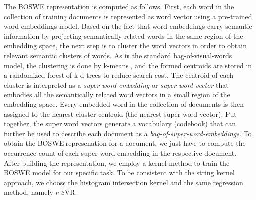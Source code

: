 \documentclass[11pt,a4paper]{article}
\begin{document}
The BOSWE representation is computed as follows. First, each word in the collection of training documents is represented as word vector using a pre-trained word embeddings model. Based on the fact that word embeddings carry semantic information by projecting semantically related words in the same region of the embedding space, the next step is to cluster the word vectors in order to obtain relevant semantic clusters of words. As in the standard bag-of-visual-words model, the clustering is done by k-means \cite{Leung-2001}, and the formed centroids are stored in a randomized forest of k-d trees \cite{Philbin-2007} to reduce search cost. The centroid of each cluster is interpreted as a \emph{super word embedding} or \emph{super word vector} that embodies all the semantically related word vectors in a small region of the embedding space. Every embedded word in the collection of documents is then assigned to the nearest cluster centroid (the nearest super word vector). Put together, the super word vectors generate a vocabulary (codebook) that can further be used to describe each document as a \emph{bag-of-super-word-embeddings}. To obtain the BOSWE represenation for a document, we just have to compute the occurrence count of each super word embedding in the respective document. After building the representation, we employ a kernel method to train the BOSWE model for our specific task. To be consistent with the string kernel approach, we choose the histogram intersection kernel and the same regression method, namely $\nu$-SVR.
\end{document}
